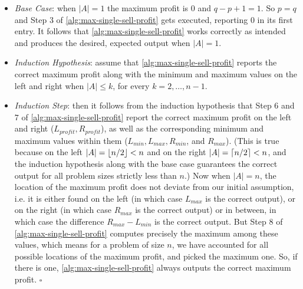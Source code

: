 \documentclass{article}
\begin{document}
\begin{enumerate}[leftmargin={*}, font={\bf}, label={\arabic*.}, ref={\arabic*}]
\begin{enumerate}
        \begin{itemize}[itemsep=0pt]
          \item
            {\it Base Case}: when $|A| = 1$ the maximum profit is $0$ and $q - p + 1 = 1$. So $p =
            q$ and Step $3$ of \autoref{alg:max-single-sell-profit} gets executed, reporting $0$ in
            its first entry. It follows that \autoref{alg:max-single-sell-profit} works correctly
            as intended and produces the desired, expected output when $|A| = 1$.

          \item
            {\it Induction Hypothesis}: assume that \autoref{alg:max-single-sell-profit} reports
            the correct maximum profit along with the minimum and maximum values on the left and
            right when $|A| \leq k$, for every $k = 2, \ldots, n-1$.

          \item
            {\it Induction Step}: then it follows from the induction hypothesis that Step $6$ and
            $7$ of \autoref{alg:max-single-sell-profit} report the correct maximum profit on the
            left and right ($L_{profit}, R_{profit}$), as well as the corresponding minimum and
            maximum values within them ($L_{min}, L_{max}, R_{min}$, and $R_{max}$). (This is true
            because on the left $|A| = \lfloor n/2\rfloor < n$ and on the right $|A| = \lceil n/2\rceil < n$,
            and the induction hypothesis along with the base case guarantees the correct output
            for all problem sizes strictly less than $n$.) Now when $|A| = n$, the location of the
            maximum profit does not deviate from our initial assumption, i.e. it is either found
            on the left (in which case $L_{max}$ is the correct output), or on the right (in which
            case $R_{max}$ is the correct output) or in between, in which case the difference
            $R_{max} - L_{min}$ is the correct output. But Step $8$ of
            \autoref{alg:max-single-sell-profit} computes precisely the maximum among these values,
            which means for a problem of size $n$, we have accounted for all possible locations of
            the maximum profit, and picked the maximum one. So, if there is one, 
            \autoref{alg:max-single-sell-profit} always outputs the correct maximum profit. \hfill
            $\square$
      \end{itemize}
    \end{enumerate}
\end{enumerate}
\end{document}
